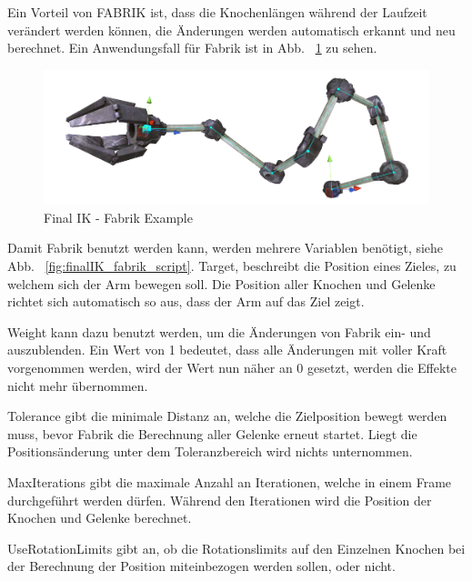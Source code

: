 \begin{itemize}
Ein Vorteil von FABRIK ist, dass die Knochenlängen während der Laufzeit verändert werden können,
die Änderungen werden automatisch erkannt und neu berechnet. Ein Anwendungsfall für Fabrik ist in Abb. ~\ref{fig:finalIK_fabrik_example} zu sehen.
\begin {figure}
    \centering
    \includegraphics[scale=0.4]{pics/finalik_fabrik_pose}
    \caption{Final IK - Fabrik Example}
    \label{fig:finalIK_fabrik_example}
\end {figure}

Damit Fabrik benutzt werden kann, werden mehrere Variablen benötigt, siehe Abb. ~\ref{fig:finalIK_fabrik_script}.
Target, beschreibt die Position eines Zieles, zu welchem sich der Arm bewegen soll.
Die Position aller Knochen und Gelenke richtet sich automatisch so aus, dass der Arm auf das Ziel zeigt.

Weight kann dazu benutzt werden, um die Änderungen von Fabrik ein- und auszublenden. Ein Wert von 1 bedeutet,
dass alle Änderungen mit voller Kraft vorgenommen werden, wird der Wert nun näher an 0 gesetzt,
werden die Effekte nicht mehr übernommen.

Tolerance gibt die minimale Distanz an, welche die Zielposition bewegt werden muss,
bevor Fabrik die Berechnung aller Gelenke erneut startet. Liegt die Positionsänderung unter dem
Toleranzbereich wird nichts unternommen.

MaxIterations gibt die maximale Anzahl an Iterationen, welche in einem Frame durchgeführt werden dürfen.
Während den Iterationen wird die Position der Knochen und Gelenke berechnet.

UseRotationLimits gibt an, ob die Rotationslimits auf den Einzelnen Knochen bei der Berechnung der Position
miteinbezogen werden sollen, oder nicht.


\end{itemize}

